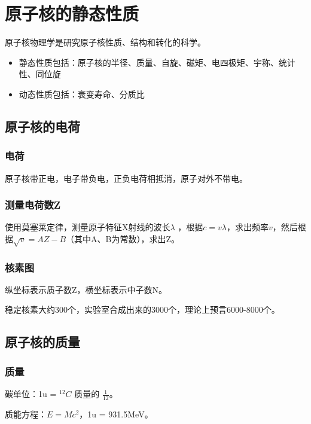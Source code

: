 \chapter{原子核的静态性质}

原子核物理学是研究原子核性质、结构和转化的科学。

\begin{itemize}
    \item 静态性质包括：原子核的半径、质量、自旋、磁矩、电四极矩、宇称、统计性、同位旋
    \item 动态性质包括：衰变寿命、分质比
\end{itemize}

\section{原子核的电荷} 

\subsection{电荷} 
 
原子核带正电，电子带负电，正负电荷相抵消，原子对外不带电。

\subsection{测量电荷数Z}

使用莫塞莱定律，测量原子特征X射线的波长$\lambda$ ，根据$c=v\lambda$，求出频率$v$，然后根据$\sqrt{v}=AZ-B$（其中A、B为常数），求出Z。

\subsection{核素图}

纵坐标表示质子数Z，横坐标表示中子数N。

稳定核素大约300个，实验室合成出来的3000个，理论上预言6000-8000个。

\section{原子核的质量}

\subsection{质量}

碳单位：1u = $^{12}C$ 质量的 $\frac{1}{12}$。

质能方程：$E = Mc^2$，1u = 931.5MeV。

